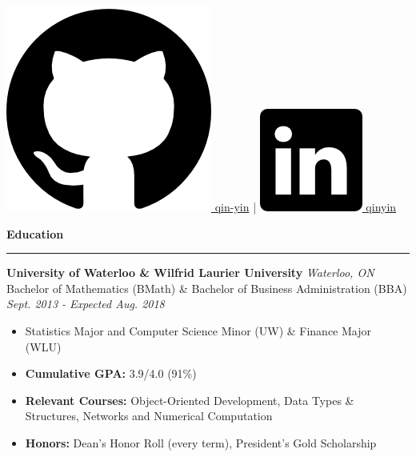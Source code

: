 \documentclass{letter}
\begin{document}
\begin{center}
{			\href{https://github.com/qin-yin}{\includegraphics[scale=0.03]{icons/github.png} \hspace{0pt} qin-yin} \hspace{2pt} | \hspace{2pt} 
			\href{https://linkedin.com/in/qinyin}{\includegraphics[scale=0.055]{icons/linkedin.png} \hspace{1pt} qinyin}}
	\end{center}
	
	 
	\begin{flushleft}
		{\Large \textbf{Education}}
		\rule[5pt]{\textwidth}{0.4pt}
		{\large \textbf{University of Waterloo \& Wilfrid Laurier University}} \hfill \textit{Waterloo, ON}\\
		Bachelor of Mathematics (BMath) \& Bachelor of Business Administration (BBA) \hfill \textit{Sept. 2013 - Expected Aug. 2018}
		\vspace{-9pt}
		\begin{itemize}
			\item Statistics Major and Computer Science Minor (UW) \& Finance Major (WLU) \vspace{-3pt}
			\item \textbf{Cumulative GPA:} 3.9/4.0 (91\%) \vspace{-3pt}
			\item \textbf{Relevant Courses:} Object-Oriented Development, Data Types \& Structures, Networks and Numerical Computation \vspace{-3pt}
			\item \textbf{Honors:} Dean's Honor Roll (every term), President's Gold Scholarship
		\end{itemize}
	\end{flushleft}
	
\end{document}
